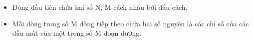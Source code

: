 \begin{itemize}
	\item     Dòng đầu tiên chứa hai số N, M cách nhau bởi dấu cách.   
	\item     Mỗi dòng trong số M dòng tiếp theo chứa hai số nguyên là các chỉ số của các đầu mút của một trong số M đoạn đường.   
\end{itemize}